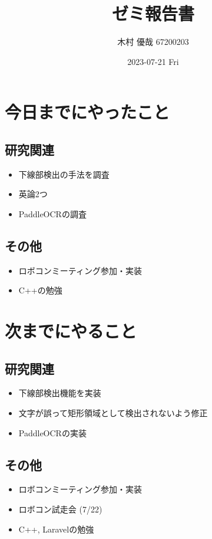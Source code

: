 \documentclass[uplatex, onecolumn, 10pt]{jsarticle}
\begin{document}
\title{\vspace{-40mm}\bf{\LARGE{ゼミ報告書}}}
\author{\vspace{-40mm}木村 優哉 67200203}
\date{2023-07-21 Fri}
\maketitle


\section{今日までにやったこと}

\subsection*{研究関連}
\begin{itemize}
	\item 下線部検出の手法を調査
	\item 英論2つ
	\item PaddleOCRの調査
\end{itemize}

\subsection*{その他}
\begin{itemize}
	\item ロボコンミーティング参加・実装
	\item C++の勉強
\end{itemize}


\section{次までにやること}

\subsection*{研究関連}
\begin{itemize}
	\item 下線部検出機能を実装
	\item 文字が誤って矩形領域として検出されないよう修正
	\item PaddleOCRの実装
\end{itemize}

\subsection*{その他}
\begin{itemize}
	\item ロボコンミーティング参加・実装
	\item ロボコン試走会 (7/22)
	\item C++, Laravelの勉強
\end{itemize}
\end{document}
